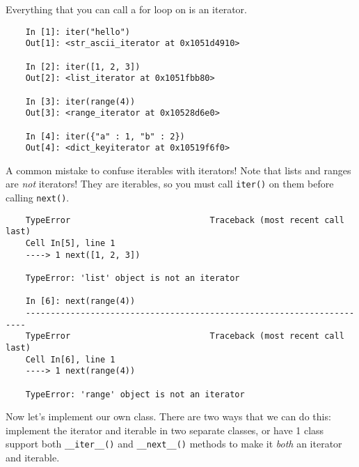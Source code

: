   Everything that you can call a for loop on is an iterator. 
  \begin{lstlisting}
    In [1]: iter("hello")
    Out[1]: <str_ascii_iterator at 0x1051d4910>

    In [2]: iter([1, 2, 3])
    Out[2]: <list_iterator at 0x1051fbb80>

    In [3]: iter(range(4))
    Out[3]: <range_iterator at 0x10528d6e0>

    In [4]: iter({"a" : 1, "b" : 2})
    Out[4]: <dict_keyiterator at 0x10519f6f0>
  \end{lstlisting} 
  A common mistake to confuse iterables with iterators! Note that lists and ranges are \textit{not} iterators! They are iterables, so you must call \texttt{iter()} on them before calling \texttt{next()}. 
  \begin{lstlisting}
    TypeError                            Traceback (most recent call last)
    Cell In[5], line 1
    ----> 1 next([1, 2, 3])

    TypeError: 'list' object is not an iterator

    In [6]: next(range(4))
    ----------------------------------------------------------------------
    TypeError                            Traceback (most recent call last)
    Cell In[6], line 1
    ----> 1 next(range(4))

    TypeError: 'range' object is not an iterator
  \end{lstlisting}

  Now let's implement our own class. There are two ways that we can do this: implement the iterator and iterable in two separate classes, or have 1 class support both \texttt{\_\_iter\_\_()} and \texttt{\_\_next\_\_()} methods to make it \textit{both} an iterator and iterable. 

